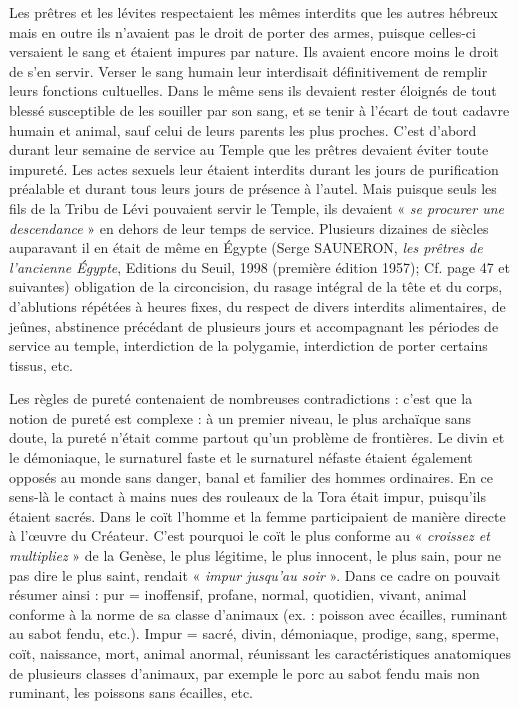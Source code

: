  Les prêtres et les lévites respectaient les mêmes interdits que les autres hébreux mais en outre ils n'avaient pas le droit de porter des armes, puisque celles-ci versaient le sang et étaient impures par nature. Ils avaient encore moins le droit de s'en servir. Verser le sang humain leur interdisait définitivement de remplir leurs fonctions cultuelles. Dans le même sens ils devaient rester éloignés de tout blessé susceptible de les souiller par son sang, et se tenir à l'écart de tout cadavre humain et animal, sauf celui de leurs parents les plus proches. C'est d'abord durant leur semaine de service au Temple que les prêtres devaient éviter toute impureté. Les actes sexuels leur étaient interdits durant les jours de purification préalable et durant tous leurs jours de présence à l'autel. Mais puisque seuls les fils de la Tribu de Lévi pouvaient servir le Temple, ils devaient « \emph{se procurer une descendance} » en dehors de leur temps de service. Plusieurs dizaines de siècles auparavant il en était de même en Égypte (Serge SAUNERON, \emph{les prêtres de l'ancienne Égypte}, Editions du Seuil, 1998 (première édition 1957); Cf. page 47 et suivantes) obligation de la circoncision, du rasage intégral de la tête et du corps, d'ablutions répétées à heures fixes, du respect de divers interdits alimentaires, de jeûnes, abstinence précédant de plusieurs jours et accompagnant les périodes de service au temple, interdiction de la polygamie, interdiction de porter certains tissus, etc. 

 Les règles de pureté contenaient de nombreuses contradictions : c'est que la notion de pureté est complexe : à un premier niveau, le plus archaïque sans doute, la pureté n'était comme partout qu'un problème de frontières. Le divin et le démoniaque, le surnaturel faste et le surnaturel néfaste étaient également opposés au monde sans danger, banal et familier des hommes ordinaires. En ce sens-là le contact à mains nues des rouleaux de la Tora était impur, puisqu'ils étaient sacrés. Dans le coït l'homme et la femme participaient de manière directe à l'œuvre du Créateur. C'est pourquoi le coït le plus conforme au « \emph{croissez et multipliez} » de la Genèse, le plus légitime, le plus innocent, le plus sain, pour ne pas dire le plus saint, rendait « \emph{impur jusqu'au soir} ». Dans ce cadre on pouvait résumer ainsi : pur = inoffensif, profane, normal, quotidien, vivant, animal conforme à la norme de sa classe d'animaux (ex. : poisson avec écailles, ruminant au sabot fendu, etc.). Impur = sacré, divin, démoniaque, prodige, sang, sperme, coït, naissance, mort, animal anormal, réunissant les caractéristiques anatomiques de plusieurs classes d'animaux, par exemple le porc au sabot fendu mais non ruminant, les poissons sans écailles, etc. 

